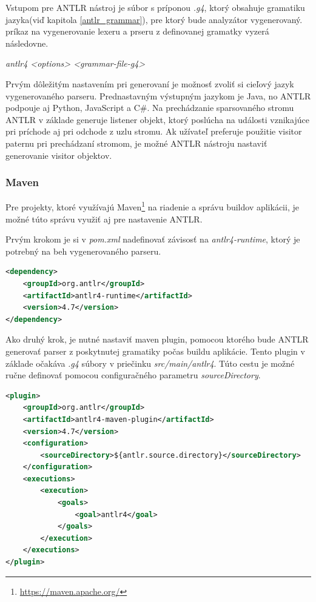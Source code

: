 Vstupom pre ANTLR nástroj je súbor s príponou \textit{.g4}, ktorý obsahuje gramatiku jazyka(viď kapitola \ref{antlr_grammar}), pre ktorý bude analyzátor vygenerovaný. príkaz na vygenerovanie lexeru a prseru z definovanej gramatky vyzerá následovne.
\begin{center}
\textit{antlr4 <options> <grammar-file-g4>}
\end{center}

Prvým dôležitým nastavením pri generovaní je možnosť zvoliť si cieľový jazyk vygenerovaného parseru. Prednastavným výstupným jazykom je Java, no ANTLR podpouje aj Python, JavaScript a C\#. Na prechádzanie sparsovaného stromu ANTLR v základe generuje listener objekt, ktorý poslúcha na události vznikajúce pri príchode aj pri odchode z uzlu stromu. Ak užívateľ preferuje použitie visitor paternu pri prechádzaní stromom, je možné ANTLR nástroju nastaviť generovanie visitor objektov.

\subsubsection{Maven}
Pre projekty, ktoré využívajú Maven\footnote{\url{https://maven.apache.org/}} na riadenie a správu buildov aplikácii, je možné túto správu využiť aj pre nastavenie ANTLR.

Prvým krokom je si v \textit{pom.xml} nadefinovať závisosť na \textit{antlr4-runtime}, ktorý je potrebný na beh vygenerovaného parseru.

\begin{lstlisting}[language=XML, frame=none, numbers=none]
<dependency>
    <groupId>org.antlr</groupId>
    <artifactId>antlr4-runtime</artifactId>
    <version>4.7</version>
</dependency>
\end{lstlisting}

Ako druhý krok, je nutné nastaviť maven plugin, pomocou ktorého bude ANTLR generovať parser z poskytnutej gramatiky počas buildu aplikácie. Tento plugin v základe očakáva \textit{.g4} súbory v priečinku \textit{src/main/antlr4}. Túto cestu je možné ručne definovať pomocou configuračného parametru \textit{sourceDirectory}.

\begin{minipage}{\linewidth}
\begin{lstlisting}[language=XML, frame=none, numbers=none]
<plugin>
    <groupId>org.antlr</groupId>
    <artifactId>antlr4-maven-plugin</artifactId>
    <version>4.7</version>
    <configuration>
        <sourceDirectory>${antlr.source.directory}</sourceDirectory>
    </configuration>
    <executions>
        <execution>
            <goals>
                <goal>antlr4</goal>
            </goals>
        </execution>
    </executions>
</plugin>
\end{lstlisting}
\end{minipage}

